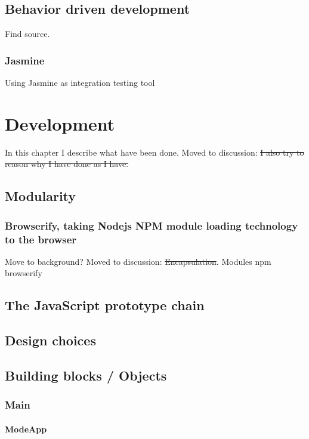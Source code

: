 \documentclass[english]{ifimaster}
\begin{document}
\section{Behavior driven development}
Find source.

\subsection{Jasmine}
Using Jasmine as integration testing tool



\chapter{Development}
In this chapter I describe what have been done. 
Moved to discussion: \sout{I also try to reason why I have done as I have.}

\section{Modularity}
\subsection{Browserify, taking Nodejs NPM module loading technology to the browser}
Move to background?
Moved to discussion: \sout {Encapsulation}.
Modules
npm
browserify


\section{The JavaScript prototype chain}

\section{Design choices}
\section{Building blocks / Objects}
\subsection{Main}
\subsubsection{ModeApp}
\end{document}
